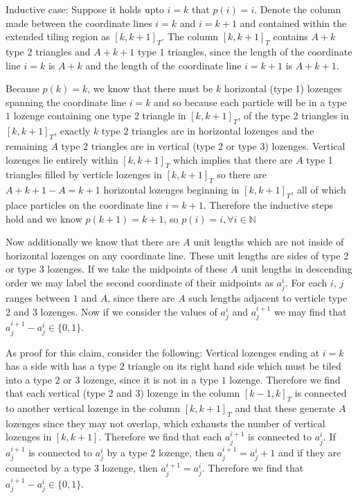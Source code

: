 \documentclass[12pt]{article}
\begin{document}
		Inductive case: Suppose it holds upto $i=k$ that $p(i)=i$. 
		Denote the column made between the coordinate lines $i=k$ and $i=k+1$ and contained within the extended tiling region as $[k,k+1]_T$. 
		The column $[k, k+1]_T$ contains $A+k$ type $2$ triangles and $A+k+1$ type $1$ triangles, since the length of the coordinate line $i=k$ is $A+k$ and the length of the coordinate line $i=k+1$ is $A+k+1$. 
		
	Because $p(k)=k$,  we know that there must be $k$ horizontal (type 1) lozenges spanning the coordinate line $i=k$ and so because each particle will be in a type $1$ lozenge containing one type 2 triangle in $[k,k+1]_T$, of the type $2$ triangles in $[k,k+1]_T$, exactly $k$ type $2$ triangles are in horizontal lozenges and the remaining $A$ type $2$ triangles are in vertical (type 2 or type 3) lozenges. 
		 Vertical lozenges lie entirely within $[k,k+1]_T$ which implies that there are $A$ type 1 triangles filled by verticle lozenges in $[k,k+1]_T$ so there are $A+k+1-A=k+1$ horizontal lozenges beginning in $[k,k+1]_T$, all of which place particles on the coordinate line $i=k+1$. 
		 Therefore the inductive steps hold and we know $p(k+1)=k+1$, so $p(i)=i, \forall i\in \mathbb{N}$
		
		Now additionally we know that there are $A$ unit lengths which are not inside of horizontal lozenges on any coordinate line. 
		These unit lengths are sides of type 2 or type 3 lozenges. 
		If we take the midpoints of these $A$ unit lengths in descending order we may label the second coordinate of their midpoints as $a_j^i$. 
		For each $i$, $j$ ranges between $1$ and $A$, since there are $A$ such lengths adjacent to verticle type 2 and 3 lozenges. 
		Now if we consider the values of $a_j^i$ and $a_j^{i+1}$ we may find that $a_j^{i+1}-a_j^i\in \{0,1\}$. 
		
		As proof for this claim, consider the following: Vertical lozenges ending at $i=k$ has a side with has a type $2$ triangle on its right hand side which must be tiled into a type $2$ or $3$ lozenge, since it is not in a type $1$ lozenge.
		Therefore we find that each vertical (type 2 and 3) lozenge in the column $[k-1,k]_T$ is connected  to another vertical lozenge in the column $[k,k+1]_T$ and that these generate $A$ lozenges since they may not overlap, which exhausts the number of vertical lozenges in $[k,k+1]$. Therefore we find that each $a_j^{i+1}$ is connected to $a_j^{i}$.
		If $a_{j}^{i+1}$ is connected to $a_j^i$ by a type $2$ lozenge, then $a_{j}^{i+1}=a_j^i+1$ and if they are connected by a type 3 lozenge, then $a_j^{i+1}=a_j^i$.
		Therefore we find that $a_j^{i+1}-a_j^i\in \{0,1\}$.
	
\end{document}
